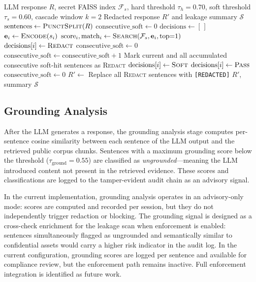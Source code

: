 \documentclass[journal]{IEEEtran}
\begin{document}
\begin{algorithm}[!ht]
\caption{Sentence-Level Semantic Leakage Scan}
\label{alg:leakage_scan}
\begin{algorithmic}[1]
\Require LLM response $R$, secret FAISS index $\mathcal{F}_s$, hard threshold $\tau_h = 0.70$, soft threshold $\tau_s = 0.60$, cascade window $k = 2$
\Ensure Redacted response $R'$ and leakage summary $\mathcal{S}$
\State $\text{sentences} \gets \textsc{PunctSplit}(R)$ 
\State $\text{consecutive\_soft} \gets 0$
\State $\text{decisions} \gets [\,]$
    \State $\mathbf{e}_i \gets \textsc{Encode}(s_i)$ 
    \State $\text{score}_i, \text{match}_i \gets \textsc{Search}(\mathcal{F}_s, \mathbf{e}_i, \text{top}{=}1)$
        \State $\text{decisions}[i] \gets \textsc{Redact}$ 
        \State $\text{consecutive\_soft} \gets 0$
        \State $\text{consecutive\_soft} \gets \text{consecutive\_soft} + 1$
            \State Mark current and all accumulated consecutive soft-hit sentences as \textsc{Redact}
        \Else
            \State $\text{decisions}[i] \gets \textsc{Soft}$
        \EndIf
    \Else
        \State $\text{decisions}[i] \gets \textsc{Pass}$
        \State $\text{consecutive\_soft} \gets 0$
    \EndIf
\EndFor
\State $R' \gets$ Replace all \textsc{Redact} sentences with \texttt{[REDACTED]}
\State \Return $R'$, summary $\mathcal{S}$
\end{algorithmic}
\end{algorithm}


\subsection{Grounding Analysis}
\label{Sect:Grounding_Validation}

After the LLM generates a response, the grounding analysis stage computes per-sentence cosine similarity between each sentence of the LLM output and the retrieved public corpus chunks. Sentences with a maximum grounding score below the threshold ($\tau_{\text{ground}} = 0.55$) are classified as \textit{ungrounded}---meaning the LLM introduced content not present in the retrieved evidence. These scores and classifications are logged to the tamper-evident audit chain as an advisory signal.

In the current implementation, grounding analysis operates in an advisory-only mode: scores are computed and recorded per session, but they do not independently trigger redaction or blocking. The grounding signal is designed as a cross-check enrichment for the leakage scan when enforcement is enabled: sentences simultaneously flagged as ungrounded and semantically similar to confidential assets would carry a higher risk indicator in the audit log. In the current configuration, grounding scores are logged per sentence and available for compliance review, but the enforcement path remains inactive. Full enforcement integration is identified as future work.
\end{document}
